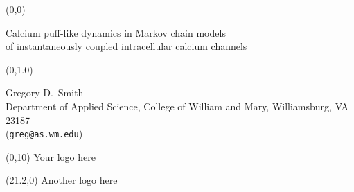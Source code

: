 \documentclass[a0]{a0poster}
\def\CHead#1{\begin{center} {\LARGE\color{DarkBlue} #1} \end{center} \bigskip}
\def\Title#1{\begin{center} {\sc \VeryHuge\color{Red} #1} \end{center} }
\begin{document}
%
%


\begin{textblock}{23}(0,0)

\Title{ Calcium puff-like dynamics in Markov chain models \\[0.5in] of instantaneously coupled intracellular calcium channels }

\end{textblock}

\begin{textblock}{23}(0,1.0)
\CHead{Gregory D.~Smith \\ 
Department of Applied Science, College of William and Mary, Williamsburg, VA 23187\\
({\tt greg@as.wm.edu})}

\end{textblock}


\begin{textblock}{2}(0,10)
Your logo here
\end{textblock}

\begin{textblock}{2}(21.2,0)
Another logo here
\end{textblock}
\end{document}
